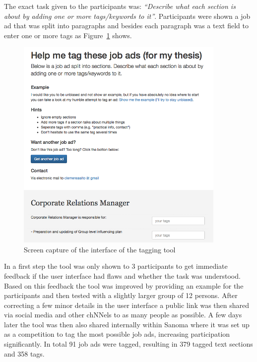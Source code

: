 The exact task given to the participants was: \emph{``Describe what each section is about by adding one or more tags/keywords to it''}. Participants were shown a job ad that was split into paragraphs and besides each paragraph was a text field to enter one or more tags as Figure~\ref{fig:thesis-tagger interface} shows.

\begin{figure}[h]
  \centering
  \includegraphics[width=0.9\textwidth]{img/thesis-tagger-interface.png}
  \caption{Screen capture of the interface of the tagging tool}
\label{fig:thesis-tagger interface}
\end{figure}

In a first step the tool was only shown to 3 participants to get immediate feedback if the user interface had flaws and whether the task was understood. Based on this feedback the tool was improved by providing an example for the participants and then tested with a slightly larger group of 12 persons. After correcting a few minor details in the user interface a public link was then shared via social media and other chNNels to as many people as possible. A few days later the tool was then also shared internally within Sanoma where it was set up as a competition to tag the most possible job ads, increasing participation significantly. In total 91 job ads were tagged, resulting in 379 tagged text sections and 358 tags.


